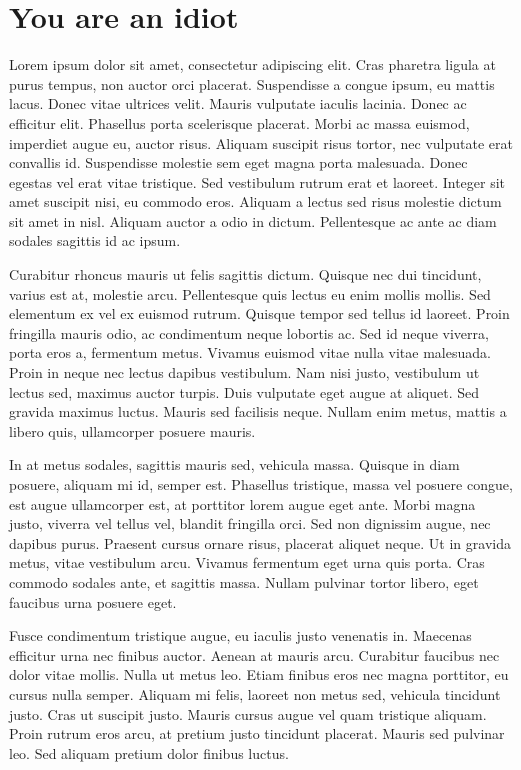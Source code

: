 \section{You are an idiot}
 Lorem ipsum dolor sit amet, consectetur adipiscing elit. Cras pharetra ligula at purus tempus, non auctor orci placerat. Suspendisse a congue ipsum, eu mattis lacus. Donec vitae ultrices velit. Mauris vulputate iaculis lacinia. Donec ac efficitur elit. Phasellus porta scelerisque placerat. Morbi ac massa euismod, imperdiet augue eu, auctor risus. Aliquam suscipit risus tortor, nec vulputate erat convallis id. Suspendisse molestie sem eget magna porta malesuada. Donec egestas vel erat vitae tristique. Sed vestibulum rutrum erat et laoreet. Integer sit amet suscipit nisi, eu commodo eros. Aliquam a lectus sed risus molestie dictum sit amet in nisl. Aliquam auctor a odio in dictum. Pellentesque ac ante ac diam sodales sagittis id ac ipsum.

Curabitur rhoncus mauris ut felis sagittis dictum. Quisque nec dui tincidunt, varius est at, molestie arcu. Pellentesque quis lectus eu enim mollis mollis. Sed elementum ex vel ex euismod rutrum. Quisque tempor sed tellus id laoreet. Proin fringilla mauris odio, ac condimentum neque lobortis ac. Sed id neque viverra, porta eros a, fermentum metus. Vivamus euismod vitae nulla vitae malesuada. Proin in neque nec lectus dapibus vestibulum. Nam nisi justo, vestibulum ut lectus sed, maximus auctor turpis. Duis vulputate eget augue at aliquet. Sed gravida maximus luctus. Mauris sed facilisis neque. Nullam enim metus, mattis a libero quis, ullamcorper posuere mauris.

In at metus sodales, sagittis mauris sed, vehicula massa. Quisque in diam posuere, aliquam mi id, semper est. Phasellus tristique, massa vel posuere congue, est augue ullamcorper est, at porttitor lorem augue eget ante. Morbi magna justo, viverra vel tellus vel, blandit fringilla orci. Sed non dignissim augue, nec dapibus purus. Praesent cursus ornare risus, placerat aliquet neque. Ut in gravida metus, vitae vestibulum arcu. Vivamus fermentum eget urna quis porta. Cras commodo sodales ante, et sagittis massa. Nullam pulvinar tortor libero, eget faucibus urna posuere eget.

Fusce condimentum tristique augue, eu iaculis justo venenatis in. Maecenas efficitur urna nec finibus auctor. Aenean at mauris arcu. Curabitur faucibus nec dolor vitae mollis. Nulla ut metus leo. Etiam finibus eros nec magna porttitor, eu cursus nulla semper. Aliquam mi felis, laoreet non metus sed, vehicula tincidunt justo. Cras ut suscipit justo. Mauris cursus augue vel quam tristique aliquam. Proin rutrum eros arcu, at pretium justo tincidunt placerat. Mauris sed pulvinar leo. Sed aliquam pretium dolor finibus luctus.

